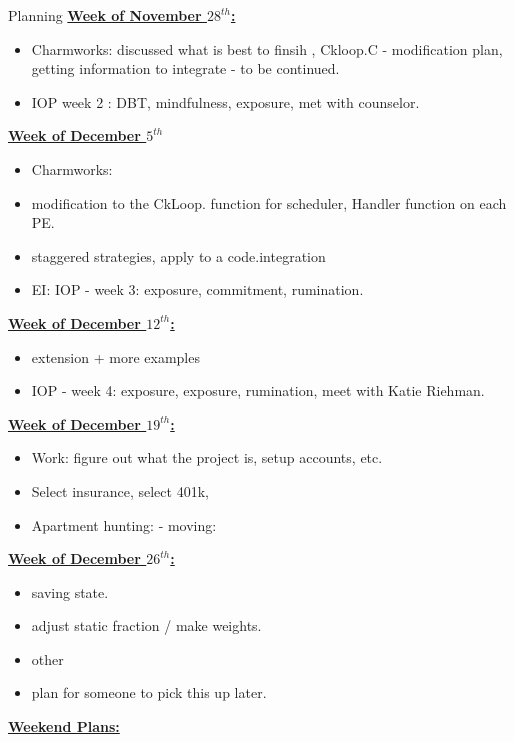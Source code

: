 \documentclass[serif, mathserif, final]{beamer}
\newcommand{\te}[1]{\textit{TimeEst:}\textit{#1}}
\newcommand{\dl}[1]{\textit{Deadline:}\textit{#1}}
\begin{document}
\begin{frame}
\begin{columns}
\begin{column}{0.5\textwidth}
\begin{block}{Planning}
\underline{{\bf Week of November $28^{th}$: }}
\begin{itemize} 
\tiny \item \small Charmworks: discussed what is best to finsih ,  Ckloop.C -
modification plan, getting information to integrate - to be
continued.
\item \small IOP week 2 : DBT, mindfulness, exposure,  met with counselor.
\end{itemize}

\underline{{\bf Week of December $5^{th}$}}
\begin{itemize}
\small \item \small Charmworks:
\item \small modification to the CkLoop.  function for scheduler, Handler
function on each PE.
\item \small staggered strategies, apply to a code.integration
\item \small EI: IOP - week 3: exposure, commitment, rumination.
\end{itemize} 

\underline{{\bf Week of December $12^{th}$:}} 
\begin{itemize} 
\small \item \small extension + more examples
\item \small IOP - week 4: exposure, exposure, rumination,   meet with Katie
Riehman.
\end{itemize} 

\underline{{\bf Week of December $19^{th}$:}}

\begin{itemize} 
\small \item \small Work: figure out what the project is, setup accounts, etc.
\item \small Select insurance, select 401k,
\item \small Apartment hunting: - moving:
\end{itemize}

\underline{{\bf Week of December $26^{th}$:}}
\begin{itemize} 
\small \item \small saving state.
\item \small adjust static fraction / make weights.
\item \small  other
\item \small plan for someone to pick this up later.
\end{itemize} 

{\underline{\textbf{Weekend Plans:}}}
\end{block}

\end{column} %
\end{columns}

\end{frame}
\end{document}
